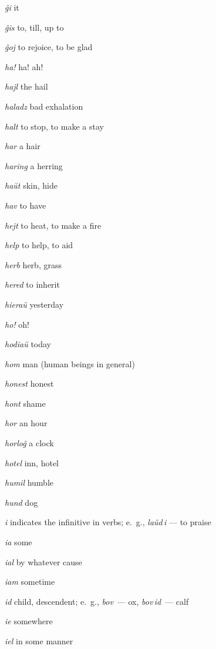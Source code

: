 \begin{landscape}
\begin{multicols}{5}
\begin{outdent}{1em}
\emph{ĝi}  it

\emph{ĝis } to, till, up to

\emph{ĝoj}  to rejoice, to be glad
\end{outdent}


\begin{outdent}{1em}
\emph{ha!  }ha! ah!

\emph{hajl}  the hail

\emph{haladz}  bad exhalation

\emph{halt}  to stop, to make a stay

\emph{har}  a hair

\emph{haring}  a herring

\emph{haŭt}  skin, hide

\emph{hav } to have

\emph{hejt } to heat, to make a fire

\emph{help}  to help, to aid

\emph{herb}  herb, grass

\emph{hered}  to inherit

\emph{hieraŭ } yesterday

\emph{ho!}  oh!

\emph{hodiaŭ}  today

\emph{hom}  man (human beings in general)

\emph{honest}  honest

\emph{hont}  shame

\emph{hor}  an hour

\emph{horloĝ}  a clock

\emph{hotel}  inn, hotel

\emph{humil}  humble

\emph{hund}  dog
\end{outdent}


\begin{outdent}{1em}
\emph{i  }indicates the infinitive in verbs; e.~g., \emph{laŭd\,i} — to praise

\emph{ia  }some

\emph{ial  }by whatever cause

\emph{iam}  sometime

\emph{id}  child, descendent; e.~g., \emph{bov\,} — ox, \emph{bov\,id\,} — calf

\emph{ie}  somewhere

\emph{iel}  in some manner


\end{outdent}
\end{multicols}
\end{landscape}
